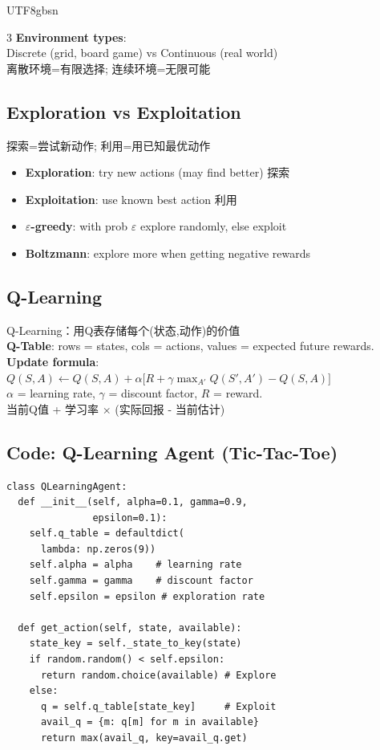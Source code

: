\documentclass[9pt,landscape,a4paper]{article}
\newcommand{\zhint}[1]{{\scriptsize\color{gray!70!black}#1}}
\begin{document}
\begin{CJK}{UTF8}{gbsn}
\begin{multicols}{3}
\textbf{Environment types}:\\
Discrete (grid, board game) vs Continuous (real world)\\
\zhint{离散环境=有限选择; 连续环境=无限可能}

\subsection{Exploration vs Exploitation}
\zhint{探索=尝试新动作; 利用=用已知最优动作}
\begin{itemize}[leftmargin=8pt,itemsep=0pt,topsep=0pt]
\item \textbf{Exploration}: try new actions (may find better) \zhint{探索}
\item \textbf{Exploitation}: use known best action \zhint{利用}
\item \textbf{$\varepsilon$-greedy}: with prob $\varepsilon$ explore randomly, else exploit
\item \textbf{Boltzmann}: explore more when getting negative rewards
\end{itemize}

\subsection{Q-Learning}
\zhint{Q-Learning：用Q表存储每个(状态,动作)的价值}\\
\textbf{Q-Table}: rows = states, cols = actions, values = expected future rewards.\\[2pt]
\textbf{Update formula}:\\
$Q(S,A) \leftarrow Q(S,A) + \alpha\big[R + \gamma \max_{A'} Q(S',A') - Q(S,A)\big]$\\[2pt]
$\alpha$ = learning rate, $\gamma$ = discount factor, $R$ = reward.\\
\zhint{当前Q值 + 学习率 $\times$ (实际回报 - 当前估计)}

\subsection{Code: Q-Learning Agent (Tic-Tac-Toe)}
\begin{lstlisting}
class QLearningAgent:
  def __init__(self, alpha=0.1, gamma=0.9,
               epsilon=0.1):
    self.q_table = defaultdict(
      lambda: np.zeros(9))
    self.alpha = alpha    # learning rate
    self.gamma = gamma    # discount factor
    self.epsilon = epsilon # exploration rate

  def get_action(self, state, available):
    state_key = self._state_to_key(state)
    if random.random() < self.epsilon:
      return random.choice(available) # Explore
    else:
      q = self.q_table[state_key]     # Exploit
      avail_q = {m: q[m] for m in available}
      return max(avail_q, key=avail_q.get)


\end{lstlisting}
\end{multicols}
\end{CJK}
\end{document}
